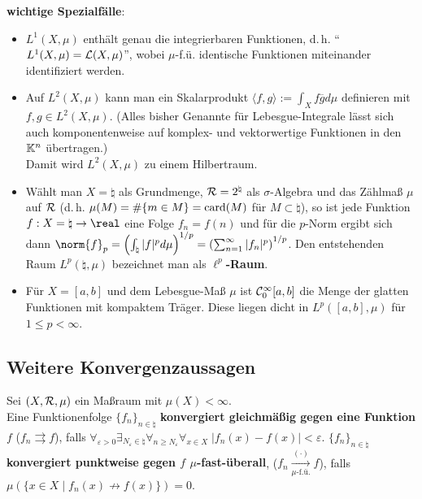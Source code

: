 \textbf{wichtige Spezialfälle}:
\begin{itemize}
    \item
    \textbf{$L^1(X, \mu)$} enthält genau die integrierbaren Funktionen, d.\,h.
    "`$L^1(X, \mu) = \mathcal{L}(X, \mu)$"', wobei $\mu$-f.ü. identische Funktionen
    miteinander identifiziert werden.

    \item
    Auf \textbf{$L^2(X, \mu)$} kann man ein Skalarprodukt
    $\langle f, g \rangle:= \int_X f \overline{g} d\mu$ definieren mit \\
    $f, g \in L^2(X, \mu)$.
    (Alles bisher Genannte für Lebesgue-Integrale lässt sich auch
    komponentenweise auf komplex- und vektorwertige Funktionen in den
    $\mathbb{K}^n$ übertragen.) \\
    Damit wird $L^2(X, \mu)$ zu einem Hilbertraum.

    \item
    Wählt man $X = \natural$ als Grundmenge, $\mathcal{R} = 2^\natural$ als
    $\sigma$-Algebra und das Zählmaß $\mu$ auf $\mathcal{R}$
    (d.\,h. $\mu(M) = \#\{m \in M\} = \operatorname{card}(M)$ für $M \subset \natural$),
    so ist jede Funktion $f: X = \natural \rightarrow \real$ eine Folge
    $f_n = f(n)$ und für die $p$-Norm ergibt sich dann
    $\norm{f}_p = \left(\int_\natural |f|^p d\mu\right)^{1/p} =
    \left(\sum_{n=1}^\infty |f_n|^p\right)^{1/p}$.
    Den entstehenden Raum $L^p(\natural, \mu)$ bezeichnet man
    als \textbf{$\ell^p$-Raum}.

    \item
    Für $X = [a,b]$ und dem Lebesgue-Maß $\mu$ ist \textbf{$\mathcal{C}_0^\infty[a,b]$}
    die Menge der glatten Funktionen mit kompaktem Träger.
    Diese liegen dicht in $L^p([a,b], \mu)$ für $1 \le p < \infty$.
\end{itemize}

\pagebreak

\subsection{%
    Weitere Konvergenzaussagen%
}

Sei $(X, \mathcal{R}, \mu)$ ein Maßraum mit $\mu(X) < \infty$. \\
Eine Funktionenfolge $\{f_n\}_{n \in \natural}$
\textbf{konvergiert gleichmäßig gegen
eine Funktion $f$} ($f_n \rightrightarrows f$), falls
$\forall_{\varepsilon > 0} \exists_{N_\varepsilon \in \natural}
\forall_{n \ge N_\varepsilon} \forall_{x \in X}\;
|f_n(x) - f(x)| < \varepsilon$.
$\{f_n\}_{n \in \natural}$
\textbf{konvergiert punktweise gegen $f$ $\mu$-fast-überall},
($f_n \xrightarrow[\mu\text{-f.ü.}]{(\cdot)} f$), falls
$\mu(\{x \in X \;|\; f_n(x) \not\to f(x)\}) = 0$.

